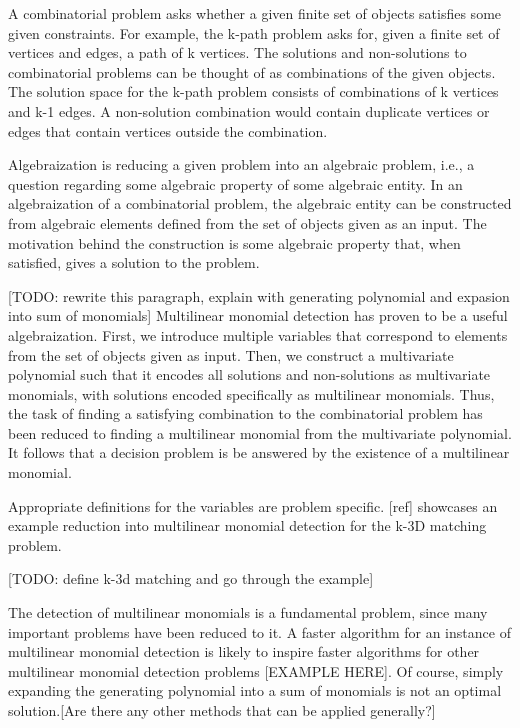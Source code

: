 A combinatorial problem asks whether a given finite set of objects satisfies some given constraints. 
For example, the k-path problem asks for, given a finite set of vertices and edges, 
a path of k vertices. The solutions and non-solutions to combinatorial problems can be thought of as 
combinations of the given objects. The solution space for the k-path problem consists of combinations of k vertices and k-1 edges. 
A non-solution combination would contain duplicate vertices or edges that contain vertices outside the combination.\nl

Algebraization is reducing a given problem into an algebraic problem, i.e., a question regarding some algebraic property of some algebraic entity. 
In an algebraization of a combinatorial problem, the algebraic entity can be constructed from algebraic elements defined from the 
set of objects given as an input. The motivation behind the construction is some algebraic property that, 
when satisfied, gives a solution to the problem.\nl

[TODO: rewrite this paragraph, explain with generating polynomial and expasion into sum of monomials]
Multilinear monomial detection has proven to be a useful algebraization. First, we introduce multiple variables that 
correspond to elements from the set of objects given as input. Then, we construct a multivariate polynomial such that it 
encodes all solutions and non-solutions as multivariate monomials, with solutions encoded specifically as multilinear monomials. 
Thus, the task of finding a satisfying combination to the combinatorial problem has been reduced to 
finding a multilinear monomial from the multivariate polynomial. It follows that a decision problem is be answered by 
the existence of a multilinear monomial.\nl

Appropriate definitions for the variables are problem specific. [ref] showcases an example 
reduction into multilinear monomial detection for the k-3D matching problem.\nl 

[TODO: define k-3d matching and go through the example]

The detection of multilinear monomials is a fundamental problem, since many important problems have been reduced to it. 
A faster algorithm for an instance of multilinear monomial detection is likely to inspire faster algorithms for 
other multilinear monomial detection problems [EXAMPLE HERE]. Of course, simply expanding the generating polynomial into 
a sum of monomials is not an optimal solution.[Are there any other methods that can be applied generally?]\nl


